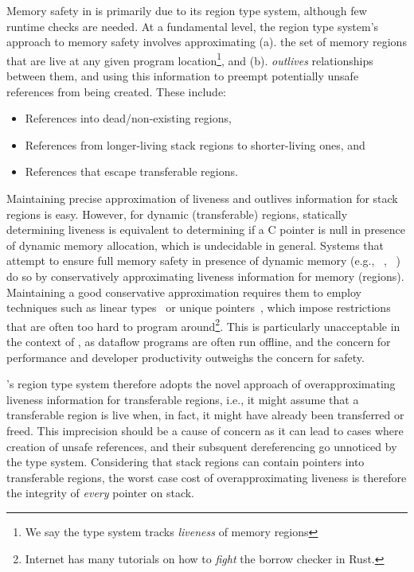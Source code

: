 Memory safety in \name is primarily due to its region type system,
although few runtime checks are needed.
At a fundamental level, the region type system's approach to memory
safety involves approximating (a). the set of memory regions that are
live at any given program location\footnote{We say the type system
tracks \emph{liveness} of memory regions}, and (b).  \emph{outlives}
relationships between them, and using this information to preempt
potentially unsafe references from being created. These include:
\begin{itemize}
\item References into dead/non-existing regions,
\item References from longer-living stack regions to shorter-living ones, and 
\item References that escape transferable regions.
\end{itemize}
Maintaining precise approximation of liveness and outlives information
for stack regions is easy. However, for dynamic (transferable) regions,
statically determining liveness is equivalent to determining if a C
pointer is null in presence of dynamic memory allocation, which is
undecidable in general. Systems that attempt to ensure full memory
safety in presence of dynamic memory (e.g., ~\cite{henglein},
~\cite{rust}) do so by conservatively approximating liveness
information for memory (regions). Maintaining a good conservative
approximation requires them to employ techniques such as linear
types~\cite{wadlerlt} or unique pointers~\cite{rust}, which impose
restrictions that are often too hard to program
around\footnote{Internet has many tutorials on how to \emph{fight} the
borrow checker in Rust.}. This is particularly unacceptable in the
context of \name, as dataflow programs are often run offline, and the
concern for performance and developer productivity outweighs the
concern for safety. 

\name's region type system therefore adopts the novel approach of
overapproximating liveness information for transferable regions, i.e.,
it might assume that a transferable region is live when, in fact, it
might have already been transferred or freed. This imprecision should
be a cause of concern as it can lead to cases where creation of unsafe
references, and their subsquent dereferencing go unnoticed by the type
system. Considering that stack regions can contain pointers into
transferable regions, the worst case cost of overapproximating
liveness is therefore the integrity of \emph{every} pointer on stack.

